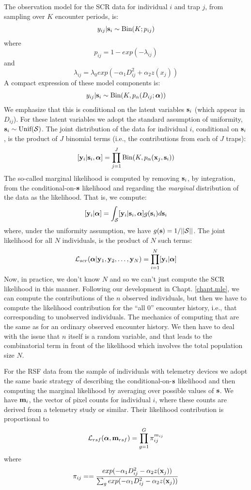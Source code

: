 The observation model for the SCR data for individual $i$ and trap $j$,
from sampling over $K$ encounter periods, is:
\[
 y_{ij}|{\bf s}_{i} \sim \mbox{Bin}(K; p_{ij})
\]
where
\[
 p_{ij} = 1-exp(- \lambda_{ij} )
\]
and
\[
 \lambda_{ij} = \lambda_{0} exp(- \alpha_{1} D_{ij}^{2} + \alpha_{2}  z(x_{j}) )
\]
A compact expression of these model components is:
\begin{equation}
y_{ij}| {\bf s}_{i} \sim \mbox{Bin}(K, p_{\alpha}(D_{ij}; {\bm \alpha}))
\label{rsf.mle.eq.cond-on-s}
\end{equation}
We emphasize that this is conditional on the latent variables ${\bf
  s}_{i}$ (which appear in $D_{ij}$). For these latent variables we
adopt the standard assumption of uniformity, ${\bf s}_{i} \sim
\mbox{Unif}({\cal S})$.  The joint distribution of the data for
individual $i$, conditional on ${\bf s}_{i}$, is the product of $J$
binomial terms (i.e., the contributions from each of $J$ traps):
\[
  [{\bf y}_{i} | {\bf s}_{i} , {\bm \alpha}] =
  \prod_{j=1}^{J} \mbox{Bin}(K, p_{\alpha}({\bf x}_{j},{\bf s}_{i}) )
\]
The so-called marginal likelihood \citep{borchers_efford:2008} is
computed by removing ${\bf s}_{i}$, by integration, from the
conditional-on-${\bf s}$ likelihood and regarding the {\it marginal}
distribution of the data as the likelihood. That is, we compute:
\[
  [{\bf y}_{i}|{\bm \alpha}] =
\int_{{\cal S}}  [ {\bf y}_{i} |{\bf s}_{i},{\bm \alpha}] g({\bf s}_{i}) d{\bf s}_{i}
\]
{\flushleft where}, under the uniformity assumption, we have
$g({\bf s}) = 1/||{\cal S}||$.
The joint likelihood for all $N$ individuals,
is the product of $N$ such terms:
\[
{\cal L}_{scr}({\bm \alpha} | {\bf y}_{1},{\bf y}_{2},\ldots, {\bf y}_{N}) = \prod_{i=1}^{N}
[{\bf y}_{i}|{\bm \alpha}]
\]
Now, in practice, we don't know $N$ and so we can't just compute the
SCR likelihood in this manner. Following our development in
Chapt. \ref{chapt.mle}, 
we can compute the contributions of the
$n$ observed individuals, but then we have to compute the likelihood
contribution for the ``all 0'' encounter history, i.e., that
corresponding to unobserved individuals. The mechanics of computing
that are the same as for an ordinary observed encounter history. We
then have to deal with the issue that $n$ itself is a random variable,
and that leads to the combinatorial term in front of the likelihood
which involves the total population size $N$.

For the RSF data from the sample of individuals with telemetry devices
we adopt the same basic strategy of describing the
conditional-on-${\bf s}$ likelihood and then computing the marginal
likelihood by averaging over possible values of ${\bf s}$.
We have ${\bf m}_{i}$, the vector of pixel counts for individual $i$,
where these counts are derived from a telemetry study or similar.
Their likelihood contribution is
proportional to
\[
 {\cal L}_{rsf}({\bm \alpha}, {\bf m}_{rsf})
 = \prod_{g=1}^{G}  \pi_{ij} ^{m_{ij}}
\]
where
\[
 \pi_{ij} =  = \frac{ exp( -\alpha_{1} D_{ij}^{2} -\alpha_{2} z({\bf x}_{j}) ) }
{ \sum_{g} exp(-\alpha_{1} D_{ij}^{2} -\alpha_{2} z({\bf x}_{j}))}
\]

